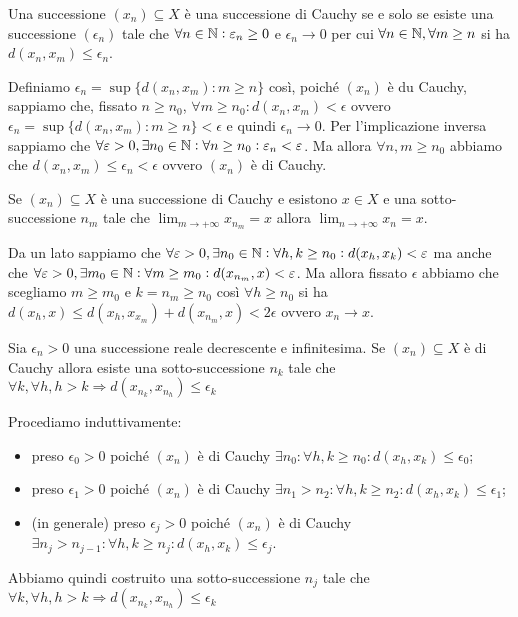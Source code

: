 \begin{es}
  Una successione $ (x_n) \subseteq X $ è una successione di Cauchy se e solo se esiste una successione $ (\epsilon_n) $ tale che $ \forall n \in \mathbb{N} : \varepsilon_n \geq 0 $ e $ \epsilon_n \to 0 $ per cui $ \forall n \in \mathbb{N}, \forall m \geq n $ si ha $ d(x_n, x_m) \leq \epsilon_n $.
\end{es}
%
Definiamo $ \epsilon_n = \sup{\{d(x_n, x_m) : m \geq n\}} $ così, poiché $ (x_n) $ è du Cauchy, sappiamo che, fissato $ n \geq n_0 $, $ \forall m \geq n_0 : d(x_n, x_m) < \epsilon $ ovvero $ \epsilon_n = \sup{\{d(x_n, x_m) : m \geq n\}} < \epsilon $ e quindi $ \epsilon_n \to 0 $. Per l'implicazione inversa sappiamo che $ \forall \varepsilon > 0, \exists n_0 \in \mathbb{N} : \forall n \geq n_0 : \varepsilon_n < \varepsilon $. Ma allora $ \forall n, m \geq n_0 $ abbiamo che $ d(x_n, x_m) \leq \epsilon_n < \epsilon $ ovvero $ (x_n) $ è di Cauchy.

\begin{es}
  Se $ (x_n) \subseteq X $ è una successione di Cauchy e esistono $ x \in X $ e una sotto-successione $ n_m $ tale che $ \lim_{m \to +\infty} x_{n_m} = x $ allora $ \lim_{n \to +\infty} x_n = x $.
\end{es}
Da un lato sappiamo che $ \forall \varepsilon > 0, \exists n_0 \in \mathbb{N} : \forall h, k \geq n_0 : d(x_h, x_k) < \varepsilon $ ma anche che $ \forall \varepsilon > 0, \exists m_0 \in \mathbb{N} : \forall m \geq m_0 : d(x_{n_m}, x) < \varepsilon $. Ma allora fissato $ \epsilon $ abbiamo che scegliamo $ m \geq m_0 $ e $ k = n_m \geq n_0 $ così $ \forall h \geq n_0 $ si ha $ d(x_h, x) \leq d(x_h, x_{x_m}) + d(x_{n_m}, x) < 2\epsilon $ ovvero $ x_n \to x $.

\begin{es}
  Sia $ \epsilon_n > 0 $ una successione reale decrescente e infinitesima. Se $ (x_n) \subseteq X $ è di Cauchy allora esiste una sotto-successione $ n_k $ tale che $ \forall k, \forall h, h > k \Rightarrow d(x_{n_k}, x_{n_h}) \leq \epsilon_k $
\end{es}
%
Procediamo induttivamente:
\begin{itemize}
\item preso $ \epsilon_0 > 0 $ poiché $ (x_n) $ è di Cauchy $ \exists n_0 : \forall h, k \geq n_0 : d(x_h, x_k) \leq \epsilon_0 $;
\item preso $ \epsilon_1 > 0 $ poiché $ (x_n) $ è di Cauchy $ \exists n_1 > n_2 : \forall h, k \geq n_2 : d(x_h, x_k) \leq \epsilon_1 $;
\item (in generale) preso $ \epsilon_j > 0 $ poiché $ (x_n) $ è di Cauchy $ \exists n_{j} > n_{j - 1} : \forall h, k \geq n_{j} : d(x_h, x_k) \leq \epsilon_j $.
\end{itemize}
Abbiamo quindi costruito una sotto-successione $ n_j $ tale che $ \forall k, \forall h, h > k \Rightarrow d(x_{n_k}, x_{n_h}) \leq \epsilon_k $

